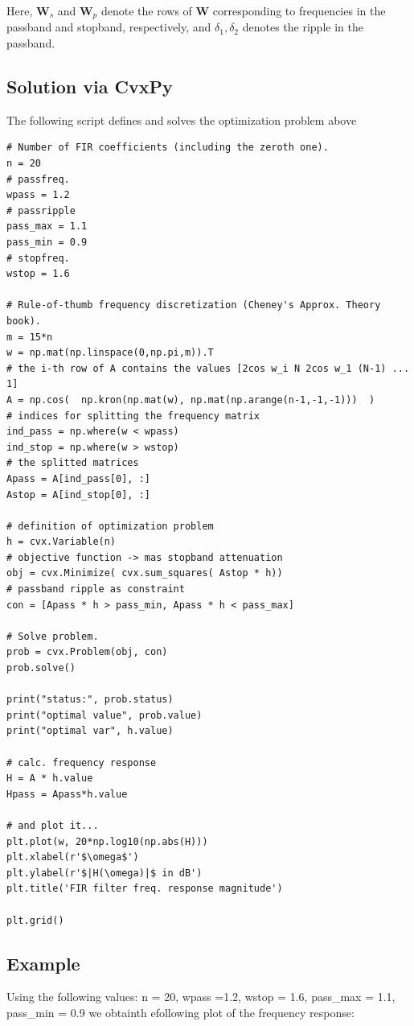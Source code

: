 Here, \(\mathbf{W}_s\) and \(\mathbf{W}_p\) denote the rows of
\(\mathbf{W}\) corresponding to frequencies in the passband and
stopband, respectively, and \(\delta_1, \delta_2\) denotes the ripple in
the passband.

\subsection{Solution via CvxPy}

The following script defines and solves the optimization problem above

\begin{verbatim}
# Number of FIR coefficients (including the zeroth one).
n = 20
# passfreq.
wpass = 1.2
# passripple
pass_max = 1.1
pass_min = 0.9
# stopfreq.
wstop = 1.6

# Rule-of-thumb frequency discretization (Cheney's Approx. Theory book).
m = 15*n
w = np.mat(np.linspace(0,np.pi,m)).T
# the i-th row of A contains the values [2cos w_i N 2cos w_1 (N-1) ... 1]
A = np.cos(  np.kron(np.mat(w), np.mat(np.arange(n-1,-1,-1)))  )
# indices for splitting the frequency matrix
ind_pass = np.where(w < wpass)
ind_stop = np.where(w > wstop)
# the splitted matrices
Apass = A[ind_pass[0], :]
Astop = A[ind_stop[0], :]

# definition of optimization problem
h = cvx.Variable(n)
# objective function -> mas stopband attenuation
obj = cvx.Minimize( cvx.sum_squares( Astop * h))
# passband ripple as constraint
con = [Apass * h > pass_min, Apass * h < pass_max]

# Solve problem.
prob = cvx.Problem(obj, con)
prob.solve()

print("status:", prob.status)
print("optimal value", prob.value)
print("optimal var", h.value)

# calc. frequency response
H = A * h.value
Hpass = Apass*h.value

# and plot it...
plt.plot(w, 20*np.log10(np.abs(H)))
plt.xlabel(r'$\omega$')
plt.ylabel(r'$|H(\omega)|$ in dB')
plt.title('FIR filter freq. response magnitude')

plt.grid()
\end{verbatim}

\subsection{Example}

Using the following values: n = 20, wpass =1.2, wstop = 1.6, pass\_max =
1.1, pass\_min = 0.9 we obtainth efollowing plot of the frequency
response:

